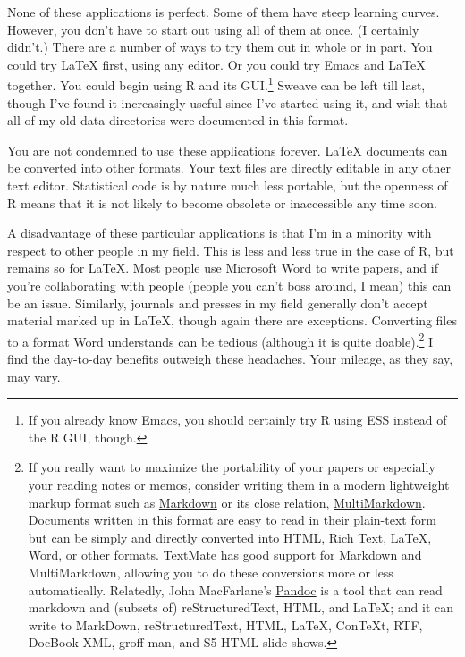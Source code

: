 \documentclass[11pt,article]{memoir}
\begin{document}
None of these applications is perfect. Some of them have steep learning curves. However, you don't have to start out using all of them at once. (I certainly didn't.) There are a number of ways to try them out in whole or in part. You could try LaTeX first, using any editor. Or you could try Emacs and LaTeX together. You could begin using R and its GUI.\footnote{If you already know Emacs, you should certainly try R using ESS instead of the R GUI, though.} Sweave can be left till last, though I've found it increasingly useful since I've started using it, and wish that all of my old data directories were documented in this format. 

You are not condemned to use these applications forever. LaTeX documents can be converted into other formats. Your text files are directly editable in any other text editor. Statistical code is by nature much less portable, but the openness of R means that it is not likely to become obsolete or inaccessible any time soon.

A disadvantage of these particular applications is that I'm in a minority with respect to other people in my field. This is less and less true in the case of R, but remains so for LaTeX. Most people use Microsoft Word to write papers, and if you're collaborating with people (people you can't boss around, I mean) this can be an issue. Similarly, journals and presses in my field generally don't accept material marked up in LaTeX, though again there are exceptions. Converting files to a format Word understands can be tedious (although it is quite doable).\footnote{If you really want to maximize the portability of your papers or especially your reading notes or memos, consider writing them in a modern lightweight markup format  such as \href{http://en.wikipedia.org/wiki/Markdown}{Markdown} or its close relation, \href{http://fletcherpenney.net/MultiMarkdown}{MultiMarkdown}. Documents written in this format are easy to read in their plain-text form but can be simply and directly converted into HTML, Rich Text, LaTeX, Word, or other formats. TextMate has good support for Markdown and MultiMarkdown, allowing you to do these conversions more or less automatically. Relatedly, John MacFarlane's \href{http://johnmacfarlane.net/pandoc/}{Pandoc} is a tool that can read markdown and (subsets of) reStructuredText, HTML, and LaTeX; and it can write to MarkDown, reStructuredText, HTML, LaTeX, ConTeXt, RTF, DocBook XML, groff man, and S5 HTML slide shows.} I find the day-to-day benefits outweigh these headaches. Your mileage, as they say, may vary.
\end{document}
